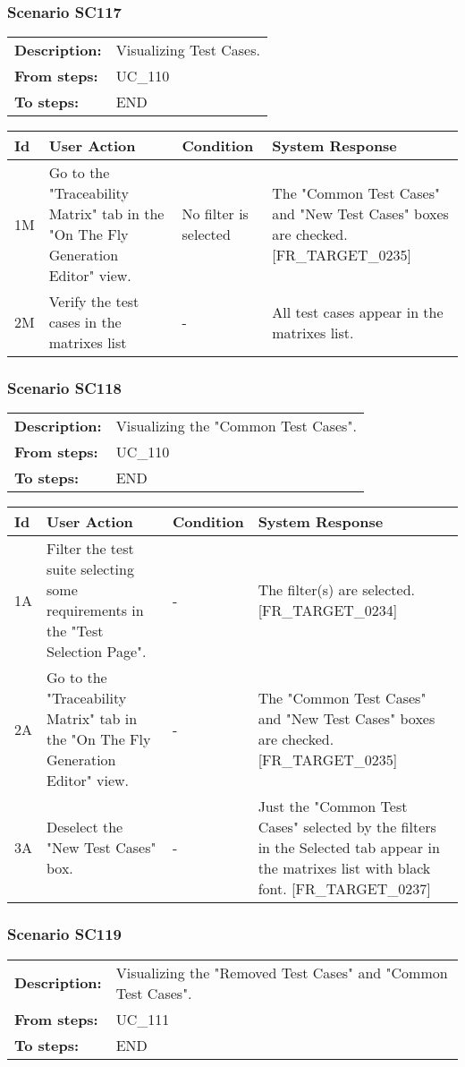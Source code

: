 \documentclass[a4paper,11pt]{article}
\newcommand{\bl}{\\ \hline}
\begin{document}
\subsubsection*{Scenario SC117}
\begin{tabular}{p{1in}p{4in}}
{\bf Description:} & Visualizing Test Cases. \\
{\bf From steps:} & UC_110#2M \\
{\bf To steps:} & END \\
\end{tabular}
 
\begin{tabular}{|p{0.8in}|p{1.6in}|p{1.6in}|p{1.6in}|}
\hline
Id & User Action & Condition & System Response  \bl 
1M & Go to the "Traceability Matrix" tab in the "On The Fly
						Generation Editor" view. & No filter is selected & The "Common Test Cases" and "New Test Cases" boxes are
						checked. [FR_TARGET_0235]  \bl 
2M & Verify the test cases in the matrixes list & - & All test cases appear in the matrixes list. \bl 
\end{tabular}
\subsubsection*{Scenario SC118}
\begin{tabular}{p{1in}p{4in}}
{\bf Description:} & Visualizing the "Common Test Cases". \\
{\bf From steps:} & UC_110#2M \\
{\bf To steps:} & END \\
\end{tabular}
 
\begin{tabular}{|p{0.8in}|p{1.6in}|p{1.6in}|p{1.6in}|}
\hline
Id & User Action & Condition & System Response  \bl 
1A & Filter the test suite selecting some requirements in the
						"Test Selection Page". & - & The filter(s) are selected. [FR_TARGET_0234] \bl 
2A & Go to the "Traceability Matrix" tab in the "On The Fly
						Generation Editor" view. & - & The "Common Test Cases" and "New Test Cases" boxes are
						checked. [FR_TARGET_0235]  \bl 
3A & Deselect the "New Test Cases" box. & - & Just the "Common Test Cases" selected by the filters in
						the Selected tab appear in the matrixes list with black font.
						[FR_TARGET_0237] \bl 
\end{tabular}
\subsubsection*{Scenario SC119}
\begin{tabular}{p{1in}p{4in}}
{\bf Description:} & Visualizing the "Removed Test Cases" and "Common Test
					Cases". \\
{\bf From steps:} & UC_111#1M \\
{\bf To steps:} & END \\
\end{tabular}
 
\end{document}
